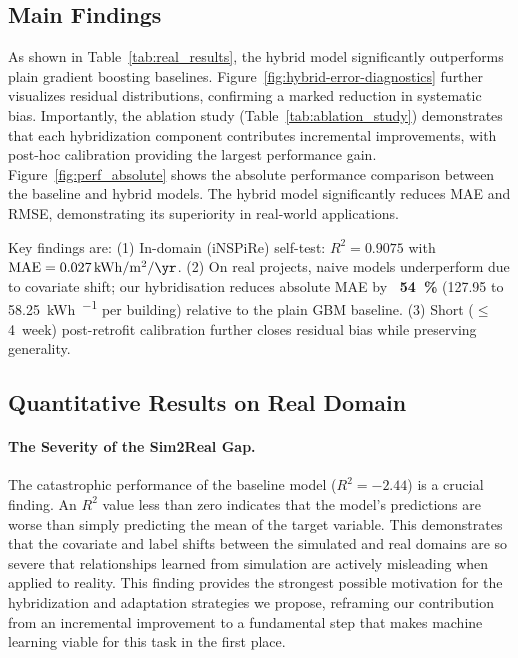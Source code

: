 ﻿\documentclass{article}
\begin{document}
\subsection{Main Findings}
As shown in Table~\ref{tab:real_results}, the hybrid model significantly outperforms 
plain gradient boosting baselines. Figure~\ref{fig:hybrid-error-diagnostics} further visualizes 
residual distributions, confirming a marked reduction in systematic bias. 
Importantly, the ablation study (Table~\ref{tab:ablation_study}) 
demonstrates that each hybridization component contributes incremental improvements, 
with post-hoc calibration providing the largest performance gain.
Figure~\ref{fig:perf_absolute} shows the absolute performance comparison between the baseline and hybrid models. The hybrid model significantly reduces MAE and RMSE, demonstrating its superiority in real-world applications.

Key findings are:
(1) In-domain (iNSPiRe) self-test: $R^2=0.9075$ with $\mathrm{MAE}=\SI{0.027}{\kWh\per\square\metre\per\yr}$.
(2) On real projects, naive models underperform due to covariate shift;
our hybridisation reduces absolute MAE by \textbf{~54~\%} (127.95 to 58.25~\si{\kWh\per\month} per building) relative to the plain GBM baseline.
(3) Short (\mbox{$\leq$4~week}) post-retrofit calibration further closes residual bias while preserving generality.
\subsection{Quantitative Results on Real Domain}
\paragraph{The Severity of the Sim2Real Gap.} The catastrophic performance of the baseline model ($R^2 = -2.44$) is a crucial finding. An $R^2$ value less than zero indicates that the model's predictions are worse than simply predicting the mean of the target variable. This demonstrates that the covariate and label shifts between the simulated and real domains are so severe that relationships learned from simulation are actively misleading when applied to reality. This finding provides the strongest possible motivation for the hybridization and adaptation strategies we propose, reframing our contribution from an incremental improvement to a fundamental step that makes machine learning viable for this task in the first place.
\end{document}
